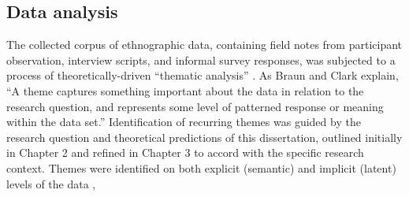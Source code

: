 \subsection{Data analysis}
The collected corpus of ethnographic data, containing field notes from participant observation, interview scripts, and informal survey responses, was subjected to a process of theoretically-driven ``thematic analysis'' \citep{Braun2006}. As Braun and Clark \textcite[10]{Braun2006}  explain, ``A theme captures something important about the data in relation to the research question, and represents some level of patterned response or meaning within the data set.'' Identification of recurring themes was guided by the research question and theoretical predictions of this dissertation, outlined initially in Chapter 2 and refined in Chapter 3 to accord with the specific research context.  Themes were identified on both explicit (semantic) and implicit (latent) levels of the data \citep{Boyatzis1998},





